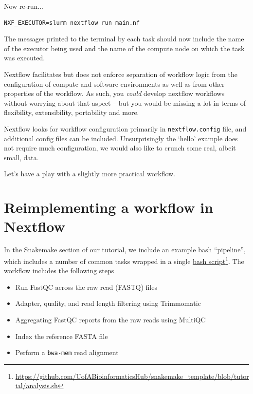 \begin{steps}

Now re-run... 
\begin{lstlisting}
NXF_EXECUTOR=slurm nextflow run main.nf
\end{lstlisting}
\end{steps}

The messages printed to the terminal by each task should now include the name of the executor being used and the name of the compute node on which the task was executed.\\


\begin{note}
Nextflow facilitates but does not enforce separation of workflow logic from the configuration
of compute and software environments as well as from other properties of the workflow.  
As such, you \textit{could} develop nextflow workflows without worrying about that 
aspect -- but you would be missing a lot in terms of flexibility, extensibility, portability and more.

Nextflow looks for workflow configuration primarily in \texttt{nextflow.config} file, and additional config files can be included. Unsurprisingly the `hello' example does not require much configuration,
we would also like to crunch some real, albeit small, data.

Let's have a play with a slightly more practical workflow.
\end{note}


\newpage


\section{Reimplementing a workflow in Nextflow}

In the Snakemake section of our tutorial, we include an example bash ``pipeline'', which 
includes a number of common tasks wrapped in a single 
\href{https://github.com/UofABioinformaticsHub/snakemake_template/blob/tutorial/analysis.sh}{bash script}\footnote{\url{https://github.com/UofABioinformaticsHub/snakemake_template/blob/tutorial/analysis.sh}}.
The workflow includes the following steps

\begin{itemize}
  \item Run FastQC across the raw read (FASTQ) files
  \item Adapter, quality, and read length filtering using Trimmomatic
  \item Aggregating FastQC reports from the raw reads using MultiQC
  \item Index the reference FASTA file
  \item Perform a \texttt{bwa-mem} read alignment
\end{itemize}

